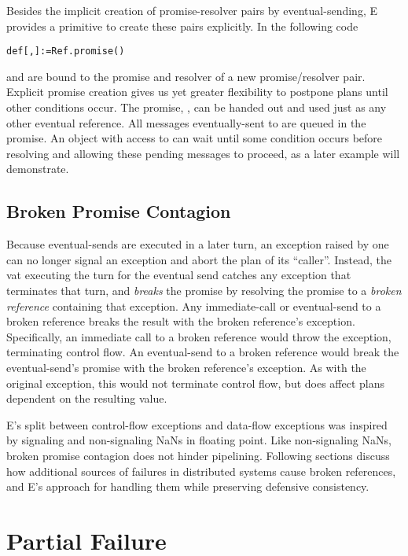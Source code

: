 \documentclass{llncs}
\begin{document}
Besides the implicit creation of promise-resolver pairs by
eventual-sending, E provides a primitive to create these pairs
explicitly. In the following code
%
\begin{alltt}
    def [, ] := Ref.promise()
\end{alltt}
%
 and  are bound to the promise and resolver of a new
promise/resolver pair. Explicit promise creation gives us yet greater
flexibility to postpone plans until other conditions occur. The
promise, , can be handed out and used just as any other
eventual reference. All messages eventually-sent to  are queued
in the promise. An object with access to  can wait until some
condition occurs before resolving  and allowing these pending
messages to proceed, as a later example will demonstrate.

\subsection{Broken Promise Contagion}

Because eventual-sends are executed in a later turn, an exception
raised by one can no longer signal an exception and abort the plan of
its ``caller''. Instead, the vat executing the turn for the eventual
send catches any exception that terminates that turn, and
\emph{breaks} the promise by resolving the promise to a \emph{broken
reference} containing that exception.  Any immediate-call or
eventual-send to a broken reference breaks the result with the broken
reference's exception.  Specifically, an immediate call to a broken
reference would throw the exception, terminating control flow.  An
eventual-send to a broken reference would break the eventual-send's
promise with the broken reference's exception. As with the original
exception, this would not terminate control flow, but does affect
plans dependent on the resulting value.

E's split between control-flow exceptions and data-flow exceptions was
inspired by signaling and non-signaling NaNs in floating point. Like
non-signaling NaNs, broken promise contagion does not hinder
pipelining. Following sections discuss how additional sources of
failures in distributed systems cause broken references, and E's
approach for handling them while preserving defensive consistency.

\section{Partial Failure}
\end{document}
